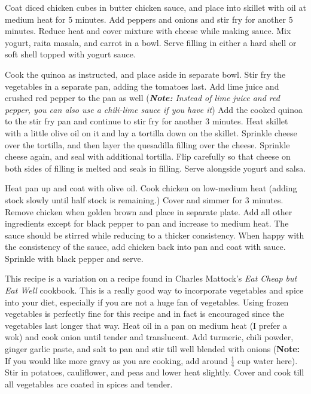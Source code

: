 \documentclass[oneside]{recipe}
\begin{document}
Coat diced chicken cubes in butter chicken sauce, and place into skillet with oil at medium heat for 5 minutes. Add peppers and onions and stir fry for another 5 minutes. Reduce heat and cover mixture with cheese while making sauce.
Mix yogurt, raita masala, and carrot in a bowl. Serve filling in either a hard shell or soft shell topped with yogurt sauce. 


Cook the quinoa as instructed, and place aside in separate bowl. Stir fry the vegetables in a separate pan, adding the tomatoes last. Add lime juice and crushed red pepper to the pan as well (\textit{\textbf{Note: } Instead of lime juice and red pepper, you can also use a chili-lime sauce if you have it}) Add the cooked quinoa to the stir fry pan and continue to stir fry for another 3 minutes. Heat skillet with a little olive oil on it and lay a tortilla down on the skillet. Sprinkle cheese over the tortilla, and then layer the quesadilla filling over the cheese. Sprinkle cheese again, and seal with additional tortilla. Flip carefully so that cheese on both sides of filling is melted and seals in filling. Serve alongside yogurt and salsa. 


Heat pan up and coat with olive oil. Cook chicken on low-medium heat (adding stock slowly until half stock is remaining.) Cover and simmer for 3 minutes. Remove chicken when golden brown and place in separate plate. Add all other ingredients except for black pepper to pan and increase to medium heat. The sauce should be stirred while reducing to a thicker consistency. When happy with the consistency of the sauce, add chicken back into pan and coat with sauce. Sprinkle with black pepper and serve. 

This recipe is a variation on a recipe found in Charles Mattock's \textit{Eat Cheap but Eat Well} cookbook. This is a really good way to incorporate vegetables and spice into your diet, especially if you are not a huge fan of vegetables. Using frozen vegetables is perfectly fine for this recipe and in fact is encouraged since the vegetables last longer that way. 
Heat oil in a pan on medium heat (I prefer a wok) and cook onion until tender and translucent. Add turmeric, chili powder, ginger garlic paste, and salt to pan and stir till well blended with onions (\textbf{Note:} If you would like more gravy as you are cooking, add around $\frac{1}{4}$ cup water here). Stir in potatoes, cauliflower, and peas and lower heat slightly. Cover and cook till all vegetables are coated in spices and tender. 
\end{document}
